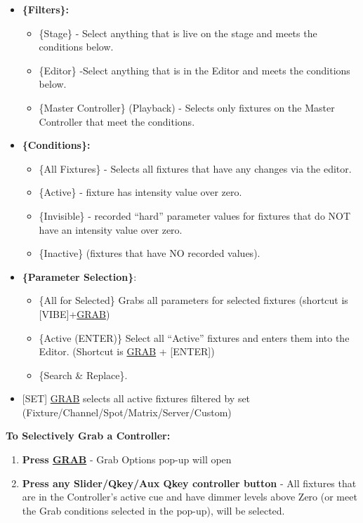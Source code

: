 \documentclass[
]{article}
\begin{document}
\begin{itemize}
\item
  \textbf{\{Filters\}:}

  \begin{itemize}
  \item
    \{Stage\} - Select anything that is live on the stage and meets the conditions below.
  \item
    \{Editor\} -Select anything that is in the Editor and meets the conditions below.
  \item
    \{Master Controller\} (Playback) - Selects only fixtures on the Master Controller that meet the conditions.
  \end{itemize}
\item
  \textbf{\{Conditions\}:}

  \begin{itemize}
  \item
    \{All Fixtures\} - Selects all fixtures that have any changes via the editor.
  \item
    \{Active\} - fixture has intensity value over zero.
  \item
    \{Invisible\} - recorded ``hard'' parameter values for fixtures that do NOT have an intensity value over zero.
  \item
    \{Inactive\} (fixtures that have NO recorded values).
  \end{itemize}
\item
  \textbf{\{Parameter Selection\}}:

  \begin{itemize}
  \item
    \{All for Selected\} Grabs all parameters for selected fixtures (shortcut is {[}VIBE{]}+\protect\hyperlink{grab}{GRAB})
  \item
    \{Active (ENTER)\} Select all ``Active'' fixtures and enters them into the Editor. (Shortcut is \protect\hyperlink{grab}{GRAB} + {[}ENTER{]})
  \item
    {\{Search \& Replace\}}.
  \end{itemize}
\item
  {[}SET{]} \protect\hyperlink{grab}{GRAB} selects all active fixtures filtered by set (Fixture/Channel/Spot/Matrix/Server/Custom)
\end{itemize}

\textbf{To Selectively Grab a Controller:}

\begin{enumerate}
\def\labelenumi{\arabic{enumi}.}
\item
  \textbf{Press \protect\hyperlink{grab}{GRAB}} - Grab Options pop-up will open
\item
  \textbf{Press any Slider/Qkey/Aux Qkey controller button} - All fixtures that are in the Controller's active cue and have dimmer levels above Zero (or meet the Grab conditions selected in the pop-up), will be selected.
\end{enumerate}
\end{document}
